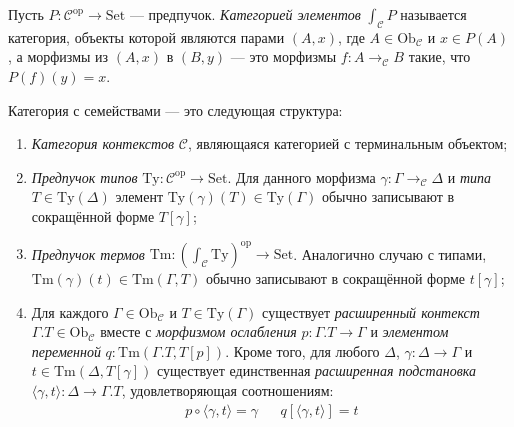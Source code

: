 \begin{definition}
    Пусть $P:\mathcal{C}^\mathrm{op}\to\mathrm{Set}$
    --- предпучок. \emph{Категорией элементов}
    $\int_\mathcal{C}P$ называется категория, объекты
    которой являются парами $(A, x)$, где
    $A\in\mathrm{Ob}_\mathcal{C}$ и $x\in P(A)$, а
    морфизмы из $(A, x)$ в $(B, y)$ --- это морфизмы
    $f:A\to_\mathcal{C} B$ такие, что $P(f)(y)=x$.
\end{definition}

\begin{definition}
    \label{cwfdef}
    Категория с семействами — это следующая структура:
    \begin{enumerate}
        \item \emph{Категория контекстов}
            $\mathcal{C}$, являющаяся категорией с
            терминальным объектом;
        \item \emph{Предпучок типов} $\mathrm{Ty}:
            \mathcal{C}^\mathrm{op}\to\mathrm{Set}$.
            Для данного морфизма
            $\gamma: \Gamma\to_\mathcal{C}\Delta$ и
            \emph{типа} $T\in\mathrm{Ty}(\Delta)$
            элемент $\mathrm{Ty}(\gamma)(T)\in
            \mathrm{Ty}(\Gamma)$ обычно записывают в
            сокращённой форме $T[\gamma]$;
        \item \emph{Предпучок термов} $\mathrm{Tm}:
            \left(\int_\mathcal{C}\mathrm{Ty}\right
            )^\mathrm{op}\to\mathrm{Set}$. Аналогично
            случаю с типами,
            $\mathrm{Tm}(\gamma)(t)\in\mathrm{Tm}
            (\Gamma, T)$ обычно записывают в
            сокращённой форме $t[\gamma]$;
        \item Для каждого
            $\Gamma\in\mathrm{Ob}_\mathcal{C}$ и
            $T\in\mathrm{Ty}(\Gamma)$ существует
            \emph{расширенный контекст}
            $\Gamma.T\in\mathrm{Ob}_\mathcal{C}$ вместе
            с \emph{морфизмом ослабления}
            $p:\Gamma.T\to\Gamma$ и
            \emph{элементом переменной}
            $q:\mathrm{Tm}(\Gamma.T, T[p])$. Кроме
            того, для любого $\Delta$,
            $\gamma:\Delta\to\Gamma$ и
            $t\in\mathrm{Tm}(\Delta, T[\gamma])$
            существует единственная \emph{расширенная
            подстановка}
            $\langle\gamma,t\rangle:\Delta\to\Gamma.T$,
            удовлетворяющая соотношениям:
            \begin{align*}
                p\circ\langle\gamma,t\rangle=\gamma & &
                q[\langle \gamma, t \rangle] = t
            \end{align*}
    \end{enumerate}
\end{definition}

